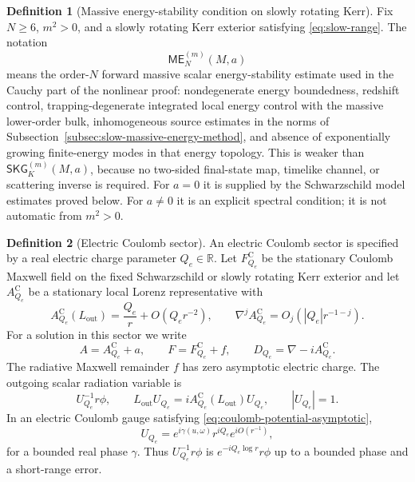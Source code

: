 \documentclass[11pt]{article}
\numberwithin{equation}{section}
\theoremstyle{plain}
\theoremstyle{definition}
\newtheorem{definition}{Definition}[section]
\theoremstyle{remark}
\newcommand{\SKG}{\mathsf{SKG}}
\newcommand{\ME}{\mathsf{ME}}
\begin{document}
\begin{definition}[Massive energy-stability condition on slowly rotating Kerr]\label{def:massive-energy-stability-condition}
Fix $N\ge6$, $m^2>0$, and a slowly rotating Kerr exterior satisfying \eqref{eq:slow-range}.  The notation
\begin{equation}\label{eq:me-condition-symbol}
 \ME^{(m)}_N(M,a)
\end{equation}
means the order-$N$ forward massive scalar energy-stability estimate used in the Cauchy part of the nonlinear proof: nondegenerate energy boundedness, redshift control, trapping-degenerate integrated local energy control with the massive lower-order bulk, inhomogeneous source estimates in the norms of Subsection~\ref{subsec:slow-massive-energy-method}, and absence of exponentially growing finite-energy modes in that energy topology.  This is weaker than \(\SKG^{(m)}_K(M,a)\), because no two-sided final-state map, timelike channel, or scattering inverse is required.  For $a=0$ it is supplied by the Schwarzschild model estimates proved below.  For $a\ne0$ it is an explicit spectral condition; it is not automatic from $m^2>0$.
\end{definition}

\begin{definition}[Electric Coulomb sector]\label{def:pure-electric-sector}
An electric Coulomb sector is specified by a real electric charge parameter
 $ Q_e\in\mathbb R$.
Let \(F^{\mathrm C}_{Q_e}\) be the stationary Coulomb Maxwell field on the fixed Schwarzschild or slowly rotating Kerr exterior and let \(A^{\mathrm C}_{Q_e}\) be a stationary local Lorenz representative with
\begin{equation}\label{eq:coulomb-potential-asymptotic}
 A^{\mathrm C}_{Q_e}(L_{\mathrm{out}})=\frac{Q_e}{r}+O(Q_e r^{-2}),
 \qquad
 \nabla^j A^{\mathrm C}_{Q_e}=O_j(|Q_e|r^{-1-j}).
\end{equation}
For a solution in this sector we write
\begin{equation}\label{eq:coulomb-splitting-main}
 A=A^{\mathrm C}_{Q_e}+a,
 \qquad
 F=F^{\mathrm C}_{Q_e}+f,
 \qquad
 D_{Q_e}=\nabla-iA^{\mathrm C}_{Q_e}.
\end{equation}
The radiative Maxwell remainder \(f\) has zero asymptotic electric charge.  The outgoing scalar radiation variable is
\begin{equation}\label{eq:electric-radiation-variable}
 U_{Q_e}^{-1}r\phi,
 \qquad
 L_{\mathrm{out}}U_{Q_e}=iA^{\mathrm C}_{Q_e}(L_{\mathrm{out}})U_{Q_e},
 \qquad |U_{Q_e}|=1.
\end{equation}
In an electric Coulomb gauge satisfying \eqref{eq:coulomb-potential-asymptotic},
\begin{equation}\label{eq:electric-log-phase}
 U_{Q_e}=e^{i\gamma(u,\omega)}r^{iQ_e}e^{iO(r^{-1})},
\end{equation}
for a bounded real phase \(\gamma\).  Thus \(U_{Q_e}^{-1}r\phi\) is \(e^{-iQ_e\log r}r\phi\) up to a bounded phase and a short-range error.
\end{definition}
\end{document}

